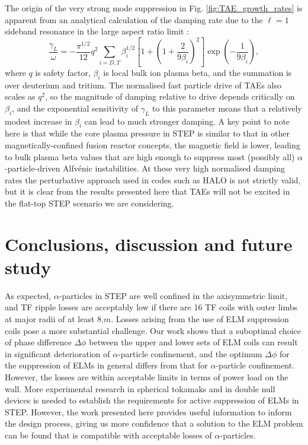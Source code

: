 \documentclass[10pt, a4paper, twoside]{article}
\begin{document}
The origin of the very strong mode suppression in Fig. \ref{fig:TAE_growth_rates} is apparent from an analytical calculation of the damping rate due to the $\ell = 1$ sideband resonance in the large aspect ratio limit \cite{betti1992}:  
\begin{equation}
    \label{eq:Landau_damping}
    \frac{\gamma_L}{\omega} = -\frac{\pi^{1/2}}{12}q^2\sum_{i=D,T}\beta_i^{1/2}\left[1+\left(1+\frac{2}{9\beta_i}\right)^2\right]\exp\left(-\frac{1}{9\beta_i}\right),
\end{equation}
where $q$ is safety factor, $\beta_i$ is local bulk ion plasma beta, and the summation is over deuterium and tritium. The normalised fast particle drive of TAEs also scales as $q^2$, so the magnitude of damping relative to drive depends critically on $\beta_i$, and the exponential sensitivity of $\gamma_L$ to this parameter means that a relatively modest increase in $\beta_i$ can lead to much stronger damping. A key point to note here is that while the core plasma pressure in STEP is similar to that in other magnetically-confined fusion reactor concepts, the magnetic field is lower, leading to bulk plasma beta values that are high enough to suppress most (possibly all) $\alpha$-particle-driven Alfv\'enic instabilities. At these very high normalised damping rates the perturbative approach used in codes such as HALO is not strictly valid, but it is clear from the results presented here that TAEs will not be excited in the flat-top STEP scenario we are considering.

\section{Conclusions, discussion and future study}
\label{sec:discussion_and_conclusions}
 
As expected, $\alpha$-particles in STEP are well confined in the axisymmetric limit, and TF ripple losses are acceptably low if there are 16 TF coils with outer limbs at major radii of at least $\si{8.m}$. Losses arising from the use of ELM suppression coils pose a more substantial challenge. Our work shows that a suboptimal choice of phase difference $\Delta\phi$ between the upper and lower sets of ELM coils can result in significant deterioration of $\alpha$-particle confinement, and the optimum $\Delta\phi$ for the suppression of ELMs in general differs from that for $\alpha$-particle confinement. However, the losses are within acceptable limits in terms of power load on the wall. More experimental research in spherical tokamaks and in double null devices is needed to establish the requirements for active suppression of ELMs in STEP. However, the work presented here provides useful information to inform the design process, giving us more confidence that a solution to the ELM problem can be found that is compatible with acceptable losses of $\alpha$-particles.
\end{document}
